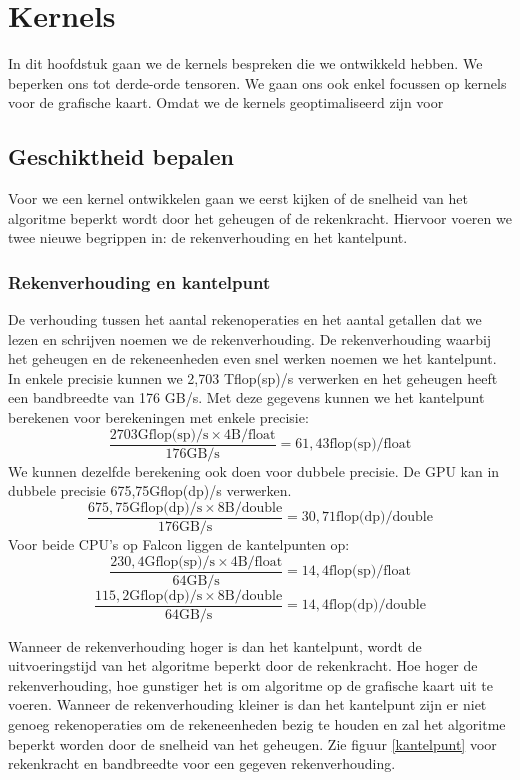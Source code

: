 \chapter{Kernels}
\label{h:kernels} 
In dit hoofdstuk gaan we de kernels bespreken die we ontwikkeld hebben. We beperken ons tot derde-orde tensoren.
We gaan ons ook enkel focussen op kernels voor de grafische kaart. Omdat we de kernels geoptimaliseerd zijn voor

\section{Geschiktheid bepalen}
Voor we een kernel ontwikkelen gaan we eerst kijken of de snelheid van het algoritme beperkt wordt door het geheugen of de rekenkracht. Hiervoor voeren we twee nieuwe begrippen in: de rekenverhouding en het kantelpunt.

\subsection{Rekenverhouding en kantelpunt}
De verhouding tussen het aantal rekenoperaties en het aantal getallen dat we lezen en schrijven noemen we de rekenverhouding. De rekenverhouding waarbij het geheugen en de rekeneenheden even snel werken noemen we het kantelpunt. In enkele precisie kunnen we 2,703 Tflop(sp)/s verwerken en het geheugen heeft een bandbreedte van 176 GB/s. Met deze gegevens kunnen we het kantelpunt berekenen voor berekeningen met enkele precisie:
\[
	\frac{2703 \text{Gflop(sp)/s} \times 4 \text{B/float}}
         {176 \text{GB/s}}										= 61,43 \text{flop(sp)/float}
\]
We kunnen dezelfde berekening ook doen voor dubbele precisie. De GPU kan in dubbele precisie 675,75Gflop(dp)/s verwerken.
\[
	\frac{675,75 \text{Gflop(dp)/s} \times 8 \text{B/double}}
         {176 \text{GB/s}}										= 30,71 \text{flop(dp)/double}
\]
Voor beide CPU's op Falcon liggen de kantelpunten op:
\[
	\frac{230,4 \text{Gflop(sp)/s} \times 4 \text{B/float}}
         {64 \text{GB/s}}										= 14,4 \text{flop(sp)/float}
\]
\[
	\frac{115,2 \text{Gflop(dp)/s} \times 8 \text{B/double}}
         {64 \text{GB/s}}										= 14,4 \text{flop(dp)/double}                                    
\]

Wanneer de rekenverhouding hoger is dan het kantelpunt, wordt de uitvoeringstijd van het algoritme beperkt door de rekenkracht. Hoe hoger de rekenverhouding, hoe gunstiger het is om algoritme op de grafische kaart uit te voeren. Wanneer de rekenverhouding kleiner is dan het kantelpunt zijn er niet genoeg rekenoperaties om de rekeneenheden bezig te houden en zal het algoritme beperkt worden door de snelheid van het geheugen. Zie figuur \ref{kantelpunt} voor rekenkracht en bandbreedte voor een gegeven rekenverhouding.

